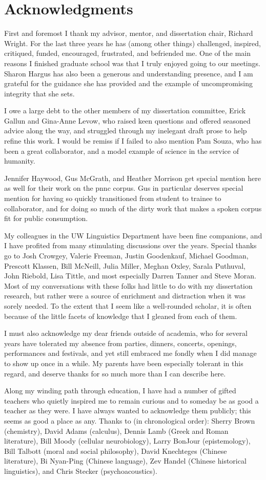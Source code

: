 \chapter*{Acknowledgments}
First and foremost I thank my advisor, mentor, and dissertation chair, Richard Wright.  For the last three years he has (among other things) challenged, inspired, critiqued, funded, encouraged, frustrated, and befriended me.  One of the main reasons I finished graduate school was that I truly enjoyed going to our meetings.  Sharon Hargus has also been a generous and understanding presence, and I am grateful for the guidance she has provided and the example of uncompromising integrity that she sets.

I owe a large debt to the other members of my dissertation committee, Erick Gallun and Gina-Anne Levow, who raised keen questions and offered seasoned advice along the way, and struggled through my inelegant draft prose to help refine this work.  I would be remiss if I failed to also mention Pam Souza, who has been a great collaborator, and a model example of science in the service of humanity.  

Jennifer Haywood, Gus McGrath, and Heather Morrison get special mention here as well for their work on the \ac{pnnc} corpus.  Gus in particular deserves special mention for having so quickly transitioned from student to trainee to collaborator, and for doing so much of the dirty work that makes a spoken corpus fit for public consumption.

My colleagues in the UW Linguistics Department have been fine companions, and I have profited from many stimulating discussions over the years.  Special thanks go to Josh Crowgey, Valerie Freeman, Justin Goodenkauf, Michael Goodman, Prescott Klassen, Bill McNeill, Julia Miller, Meghan Oxley, Sarala Puthuval, John Riebold, Lisa Tittle, and most especially Darren Tanner and Steve Moran.  Most of my conversations with these folks had little to do with my dissertation research, but rather were a source of enrichment and distraction when it was sorely needed.  To the extent that I seem like a well-rounded scholar, it is often because of the little facets of knowledge that I gleaned from each of them.  

I must also acknowledge my dear friends outside of academia, who for several years have tolerated my absence from parties, dinners, concerts, openings, performances and festivals, and yet still embraced me fondly when I did manage to show up once in a while.  My parents have been especially tolerant in this regard, and deserve thanks for so much more than I can describe here.

Along my winding path through education, I have had a number of gifted teachers who quietly inspired me to remain curious and to someday be as good a teacher as they were.  I have always wanted to acknowledge them publicly; this seems as good a place as any.  Thanks to (in chronological order): Sherry Brown (chemistry), David Adams (calculus), Dennis Lamb (Greek and Roman literature), Bill Moody (cellular neurobiology), Larry BonJour (epistemology), Bill Talbott (moral and social philosophy), David Knechteges (Chinese literature), Bi Nyan-Ping (Chinese language), Zev Handel (Chinese historical linguistics), and Chris Stecker (psychoacoustics).
